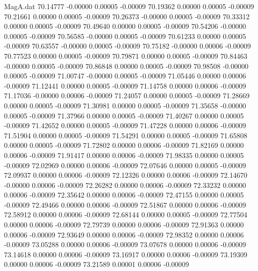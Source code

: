 \begin{filecontents}{MagA.dat}
  70.14777   -0.00000    0.00005   -0.00009
  70.19362    0.00000    0.00005   -0.00009
  70.21661    0.00000    0.00005   -0.00009
  70.26373   -0.00000    0.00005   -0.00009
  70.33312    0.00000    0.00005   -0.00009
  70.49640    0.00000    0.00005   -0.00009
  70.54206   -0.00000    0.00005   -0.00009
  70.56585   -0.00000    0.00005   -0.00009
  70.61233    0.00000    0.00005   -0.00009
  70.63557   -0.00000    0.00005   -0.00009
  70.75182   -0.00000    0.00006   -0.00009
  70.77523    0.00000    0.00005   -0.00009
  70.79871    0.00000    0.00005   -0.00009
  70.84463   -0.00000    0.00005   -0.00009
  70.86848    0.00000    0.00005   -0.00009
  70.98508   -0.00000    0.00005   -0.00009
  71.00747   -0.00000    0.00005   -0.00009
  71.05446    0.00000    0.00006   -0.00009
  71.12441    0.00000    0.00005   -0.00009
  71.14758    0.00000    0.00006   -0.00009
  71.17036   -0.00000    0.00006   -0.00009
  71.24057    0.00000    0.00005   -0.00009
  71.28669    0.00000    0.00005   -0.00009
  71.30981    0.00000    0.00005   -0.00009
  71.35658   -0.00000    0.00005   -0.00009
  71.37966    0.00000    0.00005   -0.00009
  71.40267    0.00000    0.00005   -0.00009
  71.42652    0.00000    0.00005   -0.00009
  71.47228    0.00000    0.00006   -0.00009
  71.51904    0.00000    0.00005   -0.00009
  71.54291    0.00000    0.00005   -0.00009
  71.65808    0.00000    0.00005   -0.00009
  71.72802    0.00000    0.00006   -0.00009
  71.82169    0.00000    0.00006   -0.00009
  71.91417    0.00000    0.00006   -0.00009
  71.98335    0.00000    0.00005   -0.00009
  72.02969    0.00000    0.00006   -0.00009
  72.07646    0.00000    0.00005   -0.00009
  72.09937    0.00000    0.00006   -0.00009
  72.12326    0.00000    0.00006   -0.00009
  72.14670   -0.00000    0.00006   -0.00009
  72.26282    0.00000    0.00006   -0.00009
  72.33232    0.00000    0.00006   -0.00009
  72.35642    0.00000    0.00006   -0.00009
  72.47155    0.00000    0.00005   -0.00009
  72.49466    0.00000    0.00006   -0.00009
  72.51867    0.00000    0.00006   -0.00009
  72.58912    0.00000    0.00006   -0.00009
  72.68144    0.00000    0.00005   -0.00009
  72.77504    0.00000    0.00006   -0.00009
  72.79739    0.00000    0.00006   -0.00009
  72.91363    0.00000    0.00006   -0.00009
  72.93649    0.00000    0.00006   -0.00009
  72.98352    0.00000    0.00006   -0.00009
  73.05288    0.00000    0.00006   -0.00009
  73.07678    0.00000    0.00006   -0.00009
  73.14618    0.00000    0.00006   -0.00009
  73.16917    0.00000    0.00006   -0.00009
  73.19309    0.00000    0.00006   -0.00009
  73.21589    0.00001    0.00006   -0.00009

\end{filecontents}
